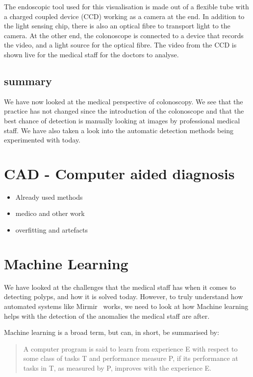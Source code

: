 The endoscopic tool used for this visualisation is made out of a flexible tube with a charged coupled device (CCD) working as a camera at the end. In addition to the light sensing chip, there is also an optical fibre to transport light to the camera. At the other end, the colonoscope is connected to a device that records the video, and a light source for the optical fibre.
The video from the CCD is shown live for the medical staff for the doctors to analyse.
\cite{Colonoscope}


\subsection{summary}
We have now looked at the medical perspective of colonoscopy. We see that the practice has not changed since the introduction of the colonoscope and that the best chance of detection is manually looking at images by professional medical staff. We have also taken a look into the automatic detection methods being experimented with today.


\section{CAD - Computer aided diagnosis}
\begin{itemize}
	\item Already used methods
	\item medico and other work
	\item overfitting and artefacts
\end{itemize}

    

\section{Machine Learning}
We have looked at the challenges that the medical staff has when it comes to detecting polyps, and how it is solved today.
However, to truly understand how automated systems like Mirmir~\cite{Steven2018MimirPaper} works, we need to look at how Machine learning helps with the detection of the anomalies the medical staff are after.  

Machine learning is a broad term, but can, in short, be summarised by:\\
\vspace{10px}

\begin{quote}
 A computer program is said to learn from experience E with respect to some class of tasks T and performance measure P, if its performance at tasks in T, as measured by P, improves with the experience E. \cite{MitchellTomM1997Ml}

\end{quote} 
\label{ML}


